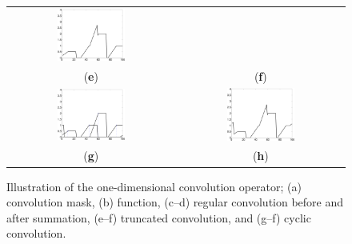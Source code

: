 \begin{figure}
\begin{tabular}{cc}
\includegraphics[width=0.425\textwidth]{./FigSparcoConvTrunc2} \\
({\bf{e}}) & ({\bf{f}}) \\
\includegraphics[width=0.425\textwidth]{./FigSparcoConvCycl1} &
\includegraphics[width=0.425\textwidth]{./FigSparcoConvCycl2} \\
({\bf{g}}) & ({\bf{h}})
\end{tabular}
\caption{Illustration of the one-dimensional convolution operator; (a)
  convolution mask, (b) function, (c--d) regular convolution before
  and after summation, (e--f) truncated convolution, and (g--f) cyclic
  convolution.}\label{Fig:SparcoConvolution}
\end{figure}

